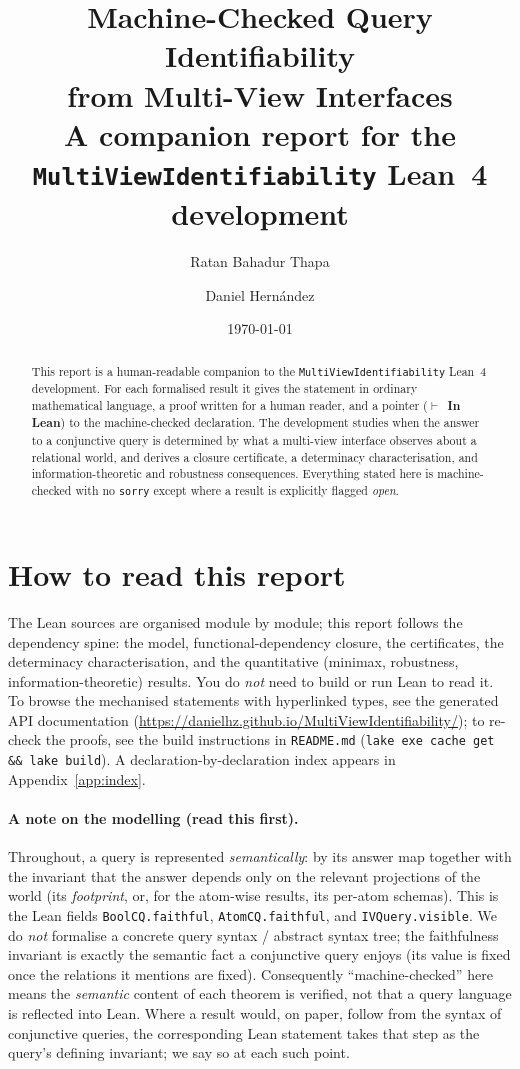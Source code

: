 \documentclass[11pt]{article}
\title{\textbf{Machine-Checked Query Identifiability\\ from Multi-View Interfaces}\\[4pt]
       \large A companion report for the \texttt{MultiViewIdentifiability} Lean~4 development}
\author{Ratan Bahadur Thapa \and Daniel Hern\'andez}
\date{\today}
\newcommand{\lean}[1]{\texttt{#1}}           %
\theoremstyle{plain}
\theoremstyle{definition}
\begin{document}
\maketitle

\begin{abstract}
This report is a human-readable companion to the \texttt{MultiViewIdentifiability} Lean~4
development. For each formalised result it gives the statement in ordinary mathematical
language, a proof written for a human reader, and a pointer ($\vdash$~\textbf{In Lean}) to the
machine-checked declaration. The development studies when the answer to a conjunctive query is
determined by what a multi-view interface observes about a relational world, and derives a
closure certificate, a determinacy characterisation, and information-theoretic and robustness
consequences. Everything stated here is machine-checked with no \texttt{sorry} except where a
result is explicitly flagged \emph{open}.
\end{abstract}

\section*{How to read this report}

The Lean sources are organised module by module; this report follows the dependency spine:
the model, functional-dependency closure, the certificates, the determinacy characterisation,
and the quantitative (minimax, robustness, information-theoretic) results. You do \emph{not}
need to build or run Lean to read it. To browse the mechanised statements with hyperlinked
types, see the generated API documentation
(\url{https://danielhz.github.io/MultiViewIdentifiability/}); to re-check the proofs, see the
build instructions in \texttt{README.md} (\texttt{lake exe cache get \&\& lake build}). A
declaration-by-declaration index appears in Appendix~\ref{app:index}.

\paragraph{A note on the modelling (read this first).}
Throughout, a query is represented \emph{semantically}: by its answer map together with the
invariant that the answer depends only on the relevant projections of the world (its
\emph{footprint}, or, for the atom-wise results, its per-atom schemas). This is the Lean
fields \lean{BoolCQ.faithful}, \lean{AtomCQ.faithful}, and \lean{IVQuery.visible}. We do
\emph{not} formalise a concrete query syntax / abstract syntax tree; the faithfulness
invariant is exactly the semantic fact a conjunctive query enjoys (its value is fixed once the
relations it mentions are fixed). Consequently ``machine-checked'' here means the
\emph{semantic} content of each theorem is verified, not that a query language is reflected
into Lean. Where a result would, on paper, follow from the syntax of conjunctive queries, the
corresponding Lean statement takes that step as the query's defining invariant; we say so at
each such point.
\end{document}
